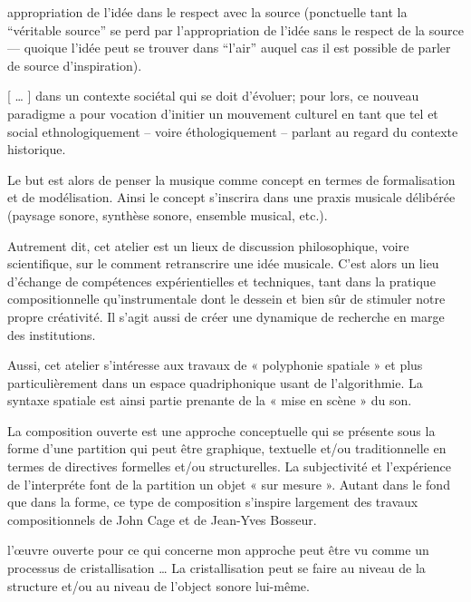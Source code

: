 \documentclass{article}
\newcommand{\footref}[1]{%
  \enotezwritemark{\enmarkstyle\ref{#1}}%
}
\begin{document}
appropriation de l’idée dans le respect avec la source (ponctuelle tant la “véritable source” se perd par l’appropriation de l’idée sans le respect de la source — quoique l’idée peut se trouver dans “l’air” auquel cas il est possible de parler de source d’inspiration).


\bigskip


[ … ] dans un contexte sociétal qui se doit d'évoluer; pour lors, ce nouveau paradigme a pour vocation d'initier un mouvement culturel en tant que tel et social ethnologiquement -- voire éthologiquement -- parlant au regard du contexte historique.%


Le but est alors de penser la musique comme concept en termes de formalisation et de modélisation. Ainsi le concept s’inscrira dans une praxis%
musicale délibérée (paysage sonore, synthèse sonore, ensemble musical, etc.).

Autrement dit, cet atelier est un lieux de discussion philosophique, voire scientifique, sur le comment retranscrire une idée musicale. C'est alors un lieu d'échange de compétences expérientielles et techniques, tant dans la pratique compositionnelle qu'instrumentale dont le dessein et bien sûr de stimuler notre propre créativité. Il s'agit aussi de créer une dynamique de recherche en marge des institutions.


Aussi, cet atelier s’intéresse aux travaux de « polyphonie spatiale » et plus particulièrement dans un espace quadriphonique usant de l'algorithmie.
La syntaxe spatiale est ainsi partie prenante de la « mise en scène » du son.

La composition ouverte est une approche conceptuelle qui se présente sous la forme d’une partition qui peut être graphique, textuelle et/ou traditionnelle en termes de directives formelles et/ou structurelles. La subjectivité et l’expérience de l’interpréte font de la partition un objet « sur mesure ». Autant dans le fond que dans la forme, ce type de composition s’inspire largement des travaux compositionnels de John Cage et de Jean-Yves Bosseur.


l’œuvre ouverte pour ce qui concerne mon approche peut être vu comme un processus de cristallisation …
La cristallisation peut se faire au niveau de la structure et/ou au niveau de l'object sonore lui-même.
\end{document}
